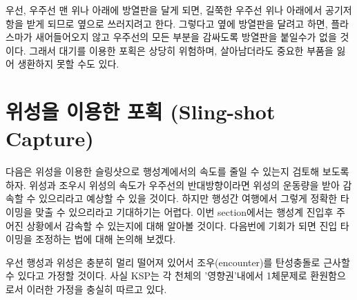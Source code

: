 \documentclass[9pt,twoside,openany]{amsbook}
\begin{document}
우선, 우주선 맨 위나 아래에 방열판을 달게 되면, 길쭉한 우주선 위나 아래에서 공기저항을 받게 되므로 옆으로 쓰러지려고 한다. 그렇다고 옆에 방열판을 달려고 하면, 플라스마가 새어들어오지 않고 우주선의 모든 부분을 감싸도록 방열판을 붙일수가 없을 것이다. 그래서 대기를 이용한 포획은 상당히 위험하며, 살아남더라도 중요한 부품을 잃어 생환하지 못할 수도 있다.


\section{위성을 이용한 포획 (Sling-shot Capture)}
다음은 위성을 이용한 슬링샷으로 행성계에서의 속도를 줄일 수 있는지 검토해 보도록 하자. 
위성과 조우시 위성의 속도가 우주선의 반대방향이라면 위성의 운동량을 받아 감속할 수 있으리라고 예상할 수 있을 것이다. 
하지만 행성간 여행에서 그렇게 정확한 타이밍을 맞출 수 있으리라고 기대하기는 어렵다. 
이번 section에서는 행성계 진입후 주어진 상황에서 감속할 수 있는지에 대해 알아볼 것이다. 
다음번에 기회가 되면 
 진입 타이밍을 조정하는 법에 대해 논의해 보겠다.

우선 행성과 위성은 충분히 멀리 떨어져 있어서 조우(encounter)를 탄성충돌로 근사할 수 있다고 가정할 것이다. 사실 KSP는 각 천체의 '영향권'내에서 1체문제로 환원함으로서 이러한 가정을 충실히 따르고 있다.
\end{document}
